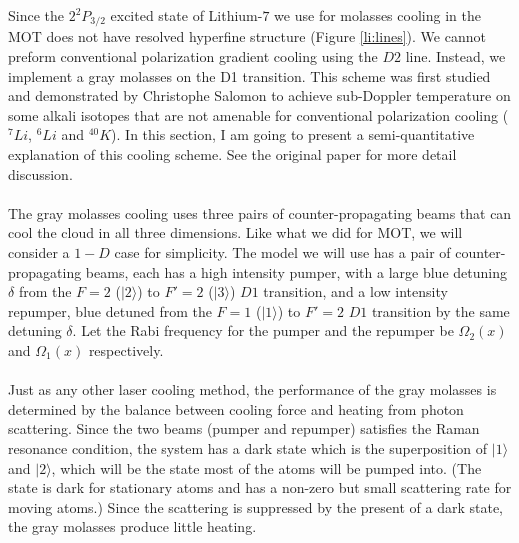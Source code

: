 Since the $2^2P_{3/2}$ excited state of Lithium-$7$ we use for molasses cooling in the MOT does not have resolved hyperfine structure (Figure \ref{li:lines}). We cannot preform conventional polarization gradient cooling using the $D2$ line. Instead, we implement a gray molasses on the D1 transition. This scheme was first studied and demonstrated by Christophe Salomon\cite{gm-theory} to achieve sub-Doppler temperature on some alkali isotopes that are not amenable for conventional polarization cooling ($^7Li$, $^6Li$ and $^{40}K$). In this section, I am going to present a semi-quantitative explanation of this cooling scheme. See the original paper\cite{gm-theory} for more detail discussion.\\
\\
The gray molasses cooling uses three pairs of counter-propagating beams that can cool the cloud in all three dimensions. Like what we did for MOT, we will consider a $1-D$ case for simplicity. The model we will use has a pair of counter-propagating beams, each has a high intensity pumper, with a large blue detuning $\delta$ from the $F=2$ ($|2\rangle$) to $F'=2$ ($|3\rangle$) $D1$ transition, and a low intensity repumper, blue detuned from the $F=1$ ($|1\rangle$) to $F'=2$ $D1$ transition by the same detuning $\delta$. Let the Rabi frequency for the pumper and the repumper be $\Omega_2(x)$ and $\Omega_1(x)$ respectively.\\
\\
Just as any other laser cooling method, the performance of the gray molasses is determined by the balance between cooling force and heating from photon scattering. Since the two beams (pumper and repumper) satisfies the Raman resonance condition, the system has a dark state which is the superposition of $|1\rangle$ and $|2\rangle$,
which will be the state most of the atoms will be pumped into. (The state is dark for stationary atoms and has a non-zero but small scattering rate for moving atoms.) Since the scattering is suppressed by the present of a dark state, the gray molasses produce little heating.\\
